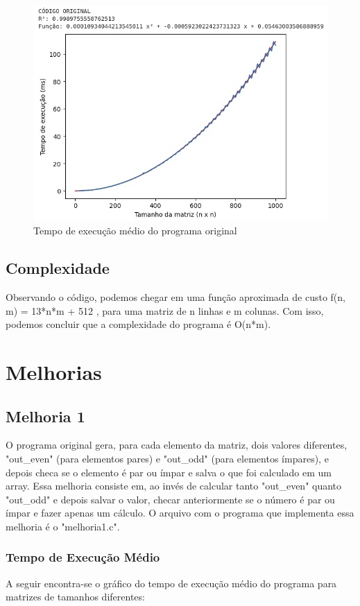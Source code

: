 \begin{figure}[!ht]
	\centering	
	\caption[\hspace{0.1cm}Tempo de execução médio do programa original]{Tempo de execução médio do programa original}
	  \vspace{-0.4cm}
	\includegraphics[width=.8\textwidth]{figuras/original.png}
\end{figure}

\newpage
\subsection{\esp Complexidade}
Observando o código, podemos chegar em uma função aproximada de custo f(n, m) = 13*n*m + 512 , para uma matriz de n linhas e m colunas. Com isso, podemos concluir que a complexidade do programa é O(n*m).



\section{\esp Melhorias}
\subsection{\esp Melhoria 1}
O programa original gera, para cada elemento da matriz, dois valores diferentes, "out\_even" (para elementos pares) e "out\_odd" (para elementos ímpares), e depois checa se o elemento é par ou ímpar e salva o que foi calculado em um array. Essa melhoria consiste em, ao invés de calcular tanto "out\_even" quanto "out\_odd" e depois salvar o valor, checar anteriormente se o número é par ou ímpar e fazer apenas um cálculo. O arquivo com o programa que implementa essa melhoria é o "melhoria1.c". 

\subsubsection{\esp Tempo de Execução Médio}
A seguir encontra-se o gráfico do tempo de execução médio do programa para matrizes de tamanhos diferentes: 


